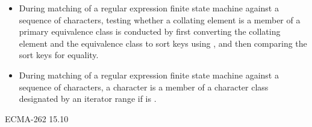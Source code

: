 \begin{itemize}
\item During matching of a regular expression finite state machine against a sequence of
characters, testing whether a collating element is a member of a primary equivalence
class is conducted by first converting the collating element and the equivalence
class to sort keys using , and then comparing the sort
keys for equality.
%
%

\item During matching of a regular expression finite state machine against a sequence
of characters, a character  is a member of a character class designated by an
iterator range  if
 is .
%
%
\end{itemize}
\xref ECMA-262 15.10

